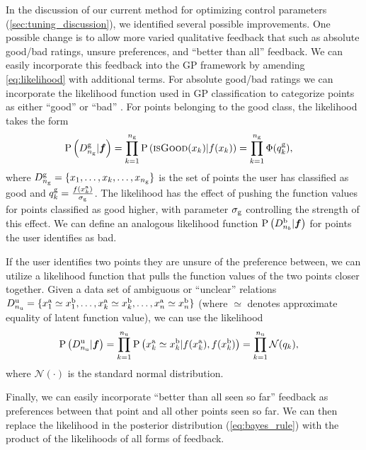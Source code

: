 In the discussion of our current method for optimizing control parameters
(\cref{sec:tuning_discussion}), we identified several possible improvements.
One possible change is to allow more varied qualitative feedback that such as
absolute good/bad ratings, unsure preferences, and ``better than all'' feedback.
We can easily incorporate this feedback into the GP framework by amending
\cref{eq:likelihood} with additional terms. For absolute good/bad ratings we can
incorporate the likelihood function used in GP classification to categorize
points as either ``good'' or ``bad'' \citep{williams2006gaussian}. For points
belonging to the good class, the likelihood takes the form
\begin{align}
    \prob{D_{n_\tn{g}}^\tn{g}|\vecf{f}} &= 
        \prod_{k=1}^{n_\tn{g}} \prob{\textsc{isGood}(x_k)| f(x_k)} 
        = \prod_{k=1}^{n_\tn{g}} \Phi(q_k^\tn{g}),
    \label{eq:likelihood_abs_good}
\end{align}
where $D_{n_{\mathrm{g}}}^{\mathrm{g}} = \{x_1, \ldots, x_k, \ldots, x_{n_{\mathrm{g}}}\}$ is the set of
points the user has classified as good and $q_k^{\mathrm{g}} =
\frac{f(x_k^{\mathrm{a}})}{\sigma_{\mathrm{g}}}$. The likelihood has the effect of pushing
the function values for points classified as good higher, with parameter
$\sigma_{\mathrm{g}}$ controlling the strength of this effect. We can define an analogous
likelihood function $\prob{D_{n_b}^\tn{b}|\vecf{f}}$ for points the user
identifies as bad.

If the user identifies two points they are unsure of the preference between, we
can utilize a likelihood function that pulls the function values of the two
points closer together. Given a data set of ambiguous or ``unclear'' relations
$D_{n_{\mathrm{u}}}^{\mathrm{u}} = \{x_1^{\mathrm{a}} \simeq x_1^{\mathrm{b}}, \ldots, x_k^{\mathrm{a}} \simeq
x_k^{\mathrm{b}}, \ldots, x_n^{\mathrm{a}} \simeq x_n^{\mathrm{b}}\}$ (where $\simeq$ denotes
approximate equality of latent function value), we can use the likelihood
\begin{align}
    \prob{D_{n_\tn{u}}^\tn{u}|\vecf{f}} &= \prod_{k=1}^{n_\tn{u}} \prob{x_k^\tn{a}
        \simeq x_k^\tn{b} | f(x_k^\tn{a}), f(x_k^\tn{b})} 
        = \prod_{k=1}^{n_\tn{u}} \mathcal{N}(q_k),
    \label{eq:likelihood_unclear}
\end{align}
where $\mathcal{N}(\cdot)$ is the standard normal distribution.

Finally, we can easily incorporate ``better than all seen so far'' feedback as
preferences between that point and all other points seen so far. We can then
replace the likelihood in the posterior distribution (\cref{eq:bayes_rule}) with
the product of the likelihoods of all forms of feedback.

